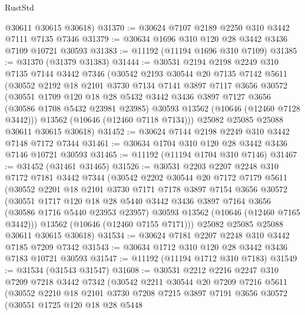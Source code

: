 \begin{lexlean}{RustStd}
\begin{coremodule}
      @30611
      @30615
      @30618)
@31370 := @30624 @7107 @2189 @2250 @310 @3442 @7111 @7135 @7346
@31379 := @30634 @1696 @310 @120 @28 @3442 @3436 @7109 @10721 @30593
@31383 := @11192 (@11194 @1696 @310 @7109)
@31385 := @31370 (@31379 @31383)
@31444 := @30531
    @2194
    @2198
    @2249
    @310
    @7135
    @7144
    @3442
    @7346
    (@30542
      @2193
      @30544
      @20
      @7135
      @7142
      @5611
      (@30552
        @2192
        @18
        @2101
        @3730
        @7134
        @7141
        @3897
        @7117
        @3656
        @30572
        (@30551
          @1709
          @120
          @18
          @28
          @5432
          @3442
          @3436
          @3897
          @7127
          @3656
          (@30586 @1708 @5432 @23981 @23985)
          @30593
          @13562
          (@10646 (@12460 @7128 @3442)))
        @13562
        (@10646 (@12460 @7118 @7134)))
      @25082
      @25085
      @25088
      @30611
      @30615
      @30618)
@31452 := @30624 @7144 @2198 @2249 @310 @3442 @7148 @7172 @7344
@31461 := @30634 @1704 @310 @120 @28 @3442 @3436 @7146 @10721 @30593
@31465 := @11192 (@11194 @1704 @310 @7146)
@31467 := @31452 (@31461 @31465)
@31526 := @30531
    @2203
    @2207
    @2248
    @310
    @7172
    @7181
    @3442
    @7344
    (@30542
      @2202
      @30544
      @20
      @7172
      @7179
      @5611
      (@30552
        @2201
        @18
        @2101
        @3730
        @7171
        @7178
        @3897
        @7154
        @3656
        @30572
        (@30551
          @1717
          @120
          @18
          @28
          @5440
          @3442
          @3436
          @3897
          @7164
          @3656
          (@30586 @1716 @5440 @23953 @23957)
          @30593
          @13562
          (@10646 (@12460 @7165 @3442)))
        @13562
        (@10646 (@12460 @7155 @7171)))
      @25082
      @25085
      @25088
      @30611
      @30615
      @30618)
@31534 := @30624 @7181 @2207 @2248 @310 @3442 @7185 @7209 @7342
@31543 := @30634 @1712 @310 @120 @28 @3442 @3436 @7183 @10721 @30593
@31547 := @11192 (@11194 @1712 @310 @7183)
@31549 := @31534 (@31543 @31547)
@31608 := @30531
    @2212
    @2216
    @2247
    @310
    @7209
    @7218
    @3442
    @7342
    (@30542
      @2211
      @30544
      @20
      @7209
      @7216
      @5611
      (@30552
        @2210
        @18
        @2101
        @3730
        @7208
        @7215
        @3897
        @7191
        @3656
        @30572
        (@30551
          @1725
          @120
          @18
          @28
          @5448

\end{coremodule}
\end{lexlean}
